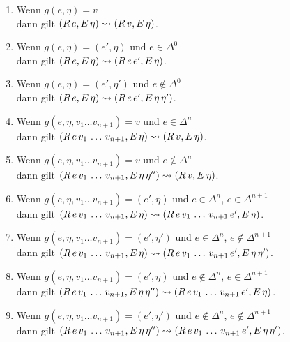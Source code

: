 \documentclass[12pt,a4paper,draft]{article}
\begin{document}
\begin{enumerate}
\item Wenn $g(e,\eta) = v$ \\
  dann gilt $(R\,e,E\,\eta) \rightsquigarrow (R\,v,E\,\eta)$.
\item Wenn $g(e,\eta) = (e',\eta)$ und $e\in\Delta^0$ \\
  dann gilt $(R\,e,E\,\eta) \rightsquigarrow (R\,e\,e',E\,\eta)$.
\item Wenn $g(e,\eta) = (e',\eta')$ und $e\not\in\Delta^0$ \\
  dann gilt $(R\,e,E\,\eta) \rightsquigarrow (R\,e\,e',E\,\eta\,\eta')$.
\item Wenn $g(e,\eta,v_1 \ldots v_{n+1}) = v$ und $e\in\Delta^n$ \\
  dann gilt $(R\,e\,v_1\,\ldots\,v_{n+1},E\,\eta) \rightsquigarrow (R\,v,E\,\eta)$.
\item Wenn $g(e,\eta,v_1 \ldots v_{n+1}) = v$ und $e\not\in\Delta^n$ \\
  dann gilt $(R\,e\,v_1\,\ldots\,v_{n+1},E\,\eta\,\eta'') \rightsquigarrow (R\,v,E\,\eta)$.
\item Wenn $g(e,\eta,v_1 \ldots v_{n+1}) = (e',\eta)$ und $e\in\Delta^n$, $e\in\Delta^{n+1}$ \\
  dann gilt $(R\,e\,v_1\,\ldots\,v_{n+1},E\,\eta) \rightsquigarrow (R\,e\,v_1\,\ldots\,v_{n+1}\,e',E\,\eta)$.
\item Wenn $g(e,\eta,v_1 \ldots v_{n+1}) = (e',\eta')$ und $e\in\Delta^n$, $e\not\in\Delta^{n+1}$ \\
  dann gilt $(R\,e\,v_1\,\ldots\,v_{n+1},E\,\eta) \rightsquigarrow (R\,e\,v_1\,\ldots\,v_{n+1}\,e',E\,\eta\,\eta')$.
\item Wenn $g(e,\eta,v_1 \ldots v_{n+1}) = (e',\eta)$ und $e\not\in\Delta^n$, $e\in\Delta^{n+1}$ \\
  dann gilt $(R\,e\,v_1\,\ldots\,v_{n+1},E\,\eta\,\eta'') \rightsquigarrow (R\,e\,v_1\,\ldots\,v_{n+1}\,e',E\,\eta)$.
\item Wenn $g(e,\eta,v_1 \ldots v_{n+1}) = (e',\eta')$ und $e\not\in\Delta^n$, $e\not\in\Delta^{n+1}$ \\
  dann gilt $(R\,e\,v_1\,\ldots\,v_{n+1},E\,\eta\,\eta'') \rightsquigarrow (R\,e\,v_1\,\ldots\,v_{n+1}\,e',E\,\eta\,\eta')$.
\end{enumerate}
\end{document}
